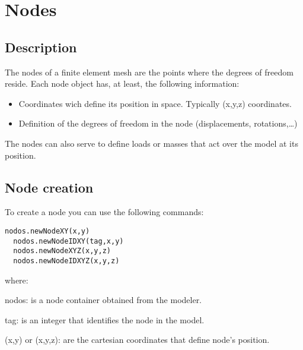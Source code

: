 \section{Nodes}

\subsection{Description}
The nodes of a finite element mesh are the points where the degrees of freedom reside. Each node object has, at least, the following information:

\begin{itemize}
\item Coordinates wich define its position in space. Typically (x,y,z) coordinates.
\item Definition of the degrees of freedom in the node (displacements, rotations,\ldots)
\end{itemize}

The nodes can also serve to define loads or masses that act over the model at its position.

\subsection{Node creation}

To create a node you can use the following commands:

\begin{lstlisting}[frame=single]
  nodos.newNodeXY(x,y)
  nodos.newNodeIDXY(tag,x,y)
  nodos.newNodeXYZ(x,y,z)
  nodos.newNodeIDXYZ(x,y,z)
\end{lstlisting}

\noindent where:

\begin{description}
\item{nodos:} is a node container obtained from the modeler.
\item{tag:} is an integer that identifies the node in the model.
\item{(x,y) or (x,y,z):} are the cartesian coordinates that define node's position.
\end{description}
